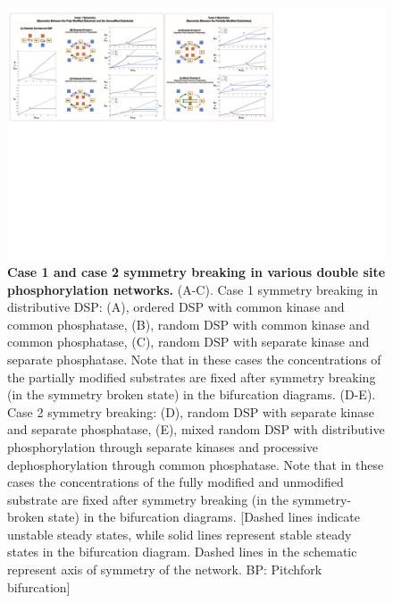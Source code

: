 \documentclass[9pt,lineno]{elife}
\begin{document}
\begin{figure}[h!]
    \begin{fullwidth}
    \centering
    \includegraphics[angle = 0, width = 0.85\paperwidth, keepaspectratio]{Fig02.pdf}
    \caption{\textbf{Case 1 and case 2 symmetry breaking in various double site phosphorylation networks.}
    (A-C). Case 1 symmetry breaking in distributive  DSP: (A), ordered DSP with common kinase and common phosphatase, (B), random DSP with common kinase and common phosphatase, (C), random  DSP with separate kinase and separate phosphatase. Note that in these cases the concentrations of the partially modified substrates are fixed after symmetry breaking  (in the symmetry broken state) in the bifurcation diagrams.
    (D-E). Case 2 symmetry breaking: (D), random  DSP with separate kinase and separate phosphatase,  (E), mixed random DSP with distributive phosphorylation through separate kinases and processive dephosphorylation through common phosphatase. Note that in these cases the concentrations of the fully modified and unmodified substrate are fixed after symmetry breaking (in the symmetry-broken state) in the bifurcation diagrams.
    [Dashed lines indicate unstable steady states, while solid lines represent stable steady states in the bifurcation diagram. Dashed lines in the  schematic represent axis of symmetry of the network. BP: Pitchfork bifurcation]}
    \label{Fig 2}
    \end{fullwidth}
\end{figure}
\end{document}
